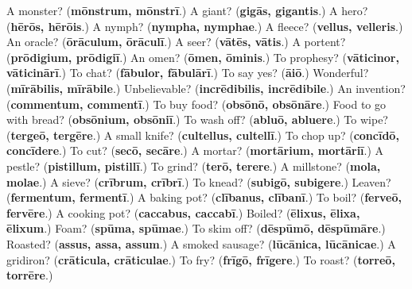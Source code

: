 \begin{tcolorbox}[breakable,colback=teal!4,colframe=teal!35!black,title={Before you move on}]
A monster? (\textbf{mōnstrum, mōnstrī}.) A giant? (\textbf{gigās, gigantis}.) A hero? (\textbf{hērōs, hērōis}.) A nymph? (\textbf{nympha, nymphae}.) A fleece? (\textbf{vellus, velleris}.) An oracle? (\textbf{ōrāculum, ōrāculī}.) A seer? (\textbf{vātēs, vātis}.) A portent? (\textbf{prōdigium, prōdigiī}.) An omen? (\textbf{ōmen, ōminis}.) To prophesy? (\textbf{vāticinor, vāticinārī}.) To chat? (\textbf{fābulor, fābulārī}.) To say yes? (\textbf{āiō}.) Wonderful? (\textbf{mīrābilis, mīrābile}.) Unbelievable? (\textbf{incrēdibilis, incrēdibile}.) An invention? (\textbf{commentum, commentī}.) To buy food? (\textbf{obsōnō, obsōnāre}.) Food to go with bread? (\textbf{obsōnium, obsōniī}.) To wash off? (\textbf{abluō, abluere}.) To wipe? (\textbf{tergeō, tergēre}.) A small knife? (\textbf{cultellus, cultellī}.) To chop up? (\textbf{concīdō, concīdere}.) To cut? (\textbf{secō, secāre}.) A mortar? (\textbf{mortārium, mortāriī}.) A pestle? (\textbf{pistillum, pistillī}.) To grind? (\textbf{terō, terere}.) A millstone? (\textbf{mola, molae}.) A sieve? (\textbf{crībrum, crībrī}.) To knead? (\textbf{subigō, subigere}.) Leaven? (\textbf{fermentum, fermentī}.) A baking pot? (\textbf{clībanus, clībanī}.) To boil? (\textbf{ferveō, fervēre}.) A cooking pot? (\textbf{caccabus, caccabī}.) Boiled? (\textbf{ēlixus, ēlixa, ēlixum}.) Foam? (\textbf{spūma, spūmae}.) To skim off? (\textbf{dēspūmō, dēspūmāre}.) Roasted? (\textbf{assus, assa, assum}.) A smoked sausage? (\textbf{lūcānica, lūcānicae}.) A gridiron? (\textbf{crāticula, crāticulae}.) To fry? (\textbf{frīgō, frīgere}.) To roast? (\textbf{torreō, torrēre}.)
\end{tcolorbox}
